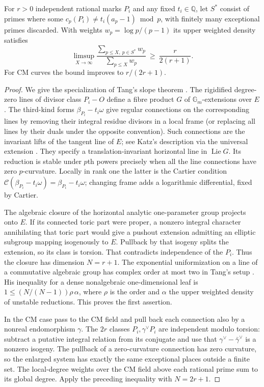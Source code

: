 \documentclass[11pt]{article}
\newcommand{\Q}{\mathbb Q}\newcommand{\Z}{\mathbb Z}\newcommand{\F}{\mathbb F}
\begin{document}
\begin{prop}
For $r>0$ independent rational marks $P_i$ and any fixed $t_i\in\Q$, let $S^\ast$ consist of primes where some $c_p(P_i)\ne t_i(a_p-1)\bmod p$, with finitely many exceptional primes discarded. With weights $w_p=\log p/(p-1)$ its upper weighted density satisfies
\[
 \limsup_{X\to\infty}\frac{\sum_{p\le X,\ p\in S^\ast}w_p}
 {\sum_{p\le X}w_p}\ \ge \ \frac{r}{2(r+1)}.
\]
For CM curves the bound improves to $r/(2r+1)$.
\end{prop}
\begin{proof}
We give the specialization of Tang's slope theorem \cite[\S5.1, Thm.~5.1.5]{Tang}. The rigidified degree-zero lines of divisor class $P_i-O$ define a fibre product $G$ of $\mathbb G_m$-extensions over $E$. The third-kind forms $\beta_{P_i}-t_i\omega$ give regular connections on the corresponding lines by removing their integral residue divisors in a local frame (or replacing all lines by their duals under the opposite convention). Such connections are the invariant lifts of the tangent line of $E$; see Katz's description via the universal extension \cite{Katz}. They specify a translation-invariant horizontal line in $\operatorname{Lie}G$. Its reduction is stable under $p$th powers precisely when all the line connections have zero $p$-curvature. Locally in rank one the latter is the Cartier condition $\mathcal C(\beta_{P_i}-t_i\omega)=\beta_{P_i}-t_i\omega$; changing frame adds a logarithmic differential, fixed by Cartier.

The algebraic closure of the horizontal analytic one-parameter group projects onto $E$. If its connected toric part were proper, a nonzero integral character annihilating that toric part would give a pushout extension admitting an elliptic subgroup mapping isogenously to $E$. Pullback by that isogeny splits the extension, so its class is torsion. That contradicts independence of the $P_i$. Thus the closure has dimension $N=r+1$. The exponential uniformization on a line of a commutative algebraic group has complex order at most two in Tang's setup \cite[proof of Prop.~2.3.4 and note 20]{Tang}. His inequality for a dense nonalgebraic one-dimensional leaf is $1\le (N/(N-1))\rho\,\alpha$, where $\rho$ is the order and $\alpha$ the upper weighted density of unstable reductions. This proves the first assertion.

In the CM case pass to the CM field and pull back each connection also by a nonreal endomorphism $\gamma$. The $2r$ classes $P_i,\gamma^\vee P_i$ are independent modulo torsion: subtract a putative integral relation from its conjugate and use that $\gamma^\vee-\bar\gamma^\vee$ is a nonzero isogeny. The pullback of a zero-curvature connection has zero curvature, so the enlarged system has exactly the same exceptional places outside a finite set. The local-degree weights over the CM field above each rational prime sum to its global degree. Apply the preceding inequality with $N=2r+1$.
\end{proof}
\end{document}

